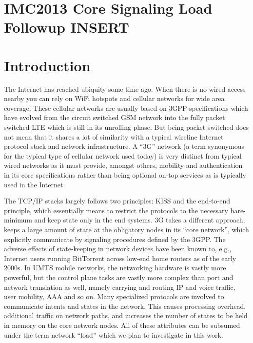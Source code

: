 

\section{IMC2013 Core Signaling Load Followup INSERT}

\section{Introduction}
\label{sec:introduction-IMC}


The Internet has reached ubiquity some time ago. When there is no wired access nearby you can rely on WiFi hotspots and cellular networks for wide area coverage. These cellular networks are usually based on \ac{3GPP} specifications which have evolved from the circuit switched \ac{GSM} network into the fully packet switched \ac{LTE} which is still in its unrolling phase. But being packet switched does not mean that it shares a lot of similarity with a typical wireline Internet protocol stack and network infrastructure. A ``3G'' network (a term synonymous for the typical type of cellular network used today) is very distinct from typical wired networks as it must provide, amongst others, mobility and authentication in its core specifications rather than being optional on-top services as is typically used in the Internet.

The TCP/IP stacks largely follows two principles: \ac{KISS} and the end-to-end principle\cite{saltzer1984end}, which essentially means to restrict the protocols to the necessary bare-minimum and keep state only in the end systems. 3G takes a different approach, keeps a large amount of state at the obligatory nodes in its ``core network'', which explicitly communicate by signaling procedures defined by the \ac{3GPP}.
The adverse effects of state-keeping in network devices have been known to, e.g.,  Internet users running BitTorrent across low-end home routers as of the early 2000s. In \ac{UMTS} mobile networks, the networking hardware is vastly more powerful, but the control plane tasks are vastly more complex than port and network translation as well, namely carrying and routing IP and voice traffic, user mobility, \ac{AAA} and so on. Many specialized protocols are involved to communicate intents and states in the network. This causes processing overhead, additional traffic on network paths, and increases the number of states to be held in memory on the core network nodes. All of these attributes can be subsumed under the term network ``load'' which we plan to investigate in this work.

